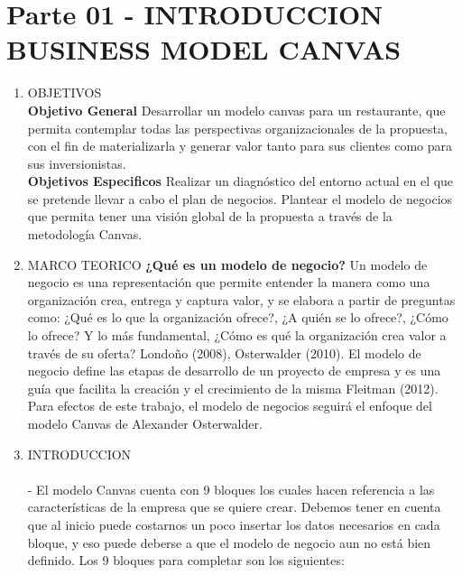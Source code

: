 \section{Parte 01 - INTRODUCCION BUSINESS MODEL CANVAS} 

\begin{enumerate}[1.]

	\item OBJETIVOS \newline
\\
	\textbf{Objetivo General} \newline
	\subitem * Desarrollar un modelo canvas para un restaurante, que permita contemplar todas las perspectivas organizacionales de la propuesta, con el fin de materializarla y generar valor tanto para sus clientes como para
sus inversionistas. \newline
\\
	\textbf{Objetivos Especificos} \newline
	\subitem * Realizar un diagnóstico del entorno actual en el que se pretende llevar a cabo el plan de negocios.
	\subitem * Plantear el modelo de negocios que permita tener una visión global de la propuesta a través de la metodología Canvas.


	\item MARCO TEORICO \newline
\textbf{¿Qué es un modelo de negocio?} \newline
Un modelo de negocio es una representación que permite entender la manera como una organización crea, entrega y captura valor, y se elabora a partir de preguntas como: ¿Qué es lo que la organización ofrece?, ¿A quién se lo ofrece?, ¿Cómo lo ofrece? Y lo más fundamental, ¿Cómo es qué la organización crea valor a través de su oferta? Londoño
(2008), Osterwalder (2010). El modelo de negocio define las etapas de desarrollo de un proyecto de empresa y es una guía que facilita la creación y el crecimiento de la misma Fleitman (2012). Para efectos de este trabajo, el modelo de negocios seguirá el enfoque del modelo Canvas de Alexander Osterwalder.

	\item INTRODUCCION
	\\\\- El modelo Canvas cuenta con 9 bloques los cuales hacen referencia a las características de la empresa que se quiere crear. Debemos tener en cuenta que al inicio puede costarnos un poco insertar los datos necesarios en cada bloque, y eso puede deberse a que el modelo de negocio aun no está bien definido.\newline
Los 9 bloques para completar son los siguientes:\newline


\end{enumerate}
